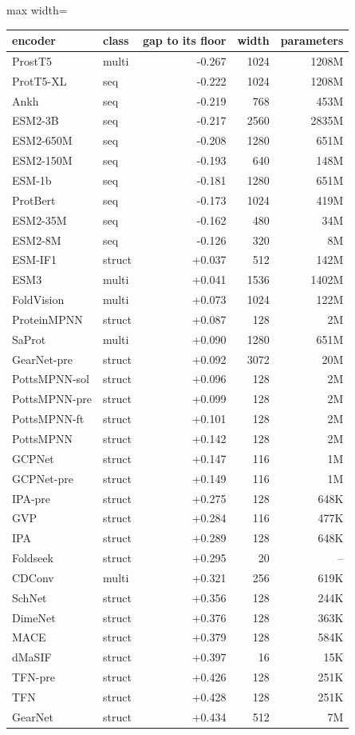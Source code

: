 \begin{adjustbox}{max width=\linewidth}
\begin{tabular}{llrrr}
\toprule
\rowcolor{CompassLavender!32}
encoder & class & gap to its floor & width & parameters \\
\midrule
ProstT5 & multi & -0.267 & 1024 & 1208M \\
ProtT5-XL & seq & -0.222 & 1024 & 1208M \\
Ankh & seq & -0.219 & 768 & 453M \\
ESM2-3B & seq & -0.217 & 2560 & 2835M \\
ESM2-650M & seq & -0.208 & 1280 & 651M \\
ESM2-150M & seq & -0.193 & 640 & 148M \\
ESM-1b & seq & -0.181 & 1280 & 651M \\
ProtBert & seq & -0.173 & 1024 & 419M \\
ESM2-35M & seq & -0.162 & 480 & 34M \\
ESM2-8M & seq & -0.126 & 320 & 8M \\
ESM-IF1 & struct & +0.037 & 512 & 142M \\
ESM3 & multi & +0.041 & 1536 & 1402M \\
FoldVision & multi & +0.073 & 1024 & 122M \\
ProteinMPNN & struct & +0.087 & 128 & 2M \\
SaProt & multi & +0.090 & 1280 & 651M \\
GearNet-pre & struct & +0.092 & 3072 & 20M \\
PottsMPNN-sol & struct & +0.096 & 128 & 2M \\
PottsMPNN-pre & struct & +0.099 & 128 & 2M \\
PottsMPNN-ft & struct & +0.101 & 128 & 2M \\
PottsMPNN & struct & +0.142 & 128 & 2M \\
GCPNet & struct & +0.147 & 116 & 1M \\
GCPNet-pre & struct & +0.149 & 116 & 1M \\
IPA-pre & struct & +0.275 & 128 & 648K \\
GVP & struct & +0.284 & 116 & 477K \\
IPA & struct & +0.289 & 128 & 648K \\
Foldseek & struct & +0.295 & 20 & -- \\
CDConv & multi & +0.321 & 256 & 619K \\
SchNet & struct & +0.356 & 128 & 244K \\
DimeNet & struct & +0.376 & 128 & 363K \\
MACE & struct & +0.379 & 128 & 584K \\
dMaSIF & struct & +0.397 & 16 & 15K \\
TFN-pre & struct & +0.426 & 128 & 251K \\
TFN & struct & +0.428 & 128 & 251K \\
GearNet & struct & +0.434 & 512 & 7M \\
\bottomrule
\end{tabular}
\end{adjustbox}
